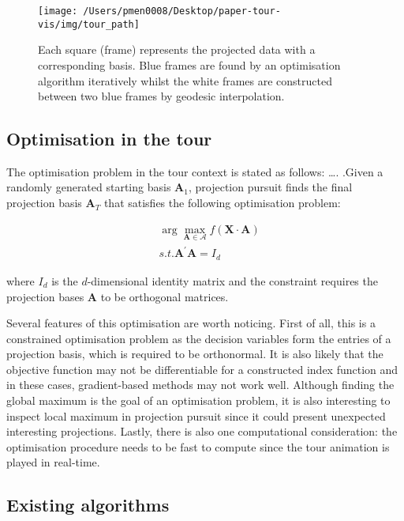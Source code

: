 \documentclass[12pt]{article}
\begin{document}
\begin{figure}

{\centering \texttt{[image: /Users/pmen0008/Desktop/paper-tour-vis/img/tour\_path]} 

}

\caption{Each square (frame) represents the projected data with a corresponding basis. Blue frames are found by an optimisation algorithm iteratively whilst the white frames are constructed between two blue frames by geodesic interpolation.}\label{fig:tour-path}
\end{figure}



\hypertarget{tour-optim}{%
\subsection{Optimisation in the tour}\label{tour-optim}}

The optimisation problem in the tour context is stated as follows:
\ldots.
.Given a randomly generated starting basis \(\mathbf{A}_1\), projection pursuit finds the final projection basis \(\mathbf{A}_T\) that satisfies the following optimisation problem:

\begin{align}
&\arg \max_{\mathbf{A} \in \mathcal{A}} f(\mathbf{X} \cdot \mathbf{A}) \\
&s.t.  \mathbf{A}^{\prime} \mathbf{A} = I_d
\end{align}

where \(I_d\) is the \(d\)-dimensional identity matrix and the constraint requires the projection bases \(\mathbf{A}\) to be orthogonal matrices.

Several features of this optimisation are worth noticing. First of all, this is a constrained optimisation problem as the decision variables form the entries of a projection basis, which is required to be orthonormal. It is also likely that the objective function may not be differentiable for a constructed index function and in these cases, gradient-based methods may not work well. Although finding the global maximum is the goal of an optimisation problem, it is also interesting to inspect local maximum in projection pursuit since it could present unexpected interesting projections. Lastly, there is also one computational consideration: the optimisation procedure needs to be fast to compute since the tour animation is played in real-time.

\hypertarget{existing-algorithms}{%
\subsection{Existing algorithms}\label{existing-algorithms}}
\end{document}
